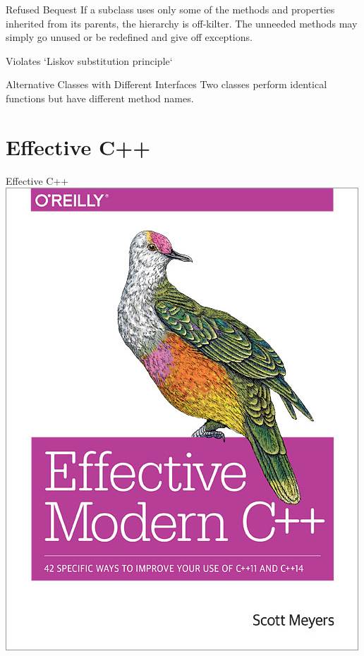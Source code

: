\documentclass{beamer}
\begin{document}
\begin{frame}{Refused Bequest}
If a subclass uses only some of the methods and properties inherited from its
parents, the hierarchy is off-kilter. The unneeded methods may simply go unused
or be redefined and give off exceptions.

Violates `Liskov substitution principle` 
\end{frame}

\begin{frame}{Alternative Classes with Different Interfaces}
Two classes perform identical functions but have different method names.
\end{frame}

\section{Effective C++}

\begin{frame}{Effective C++}
\includegraphics[scale=0.25]{img/EffectiveModernC++.png}
\end{frame}
\end{document}
